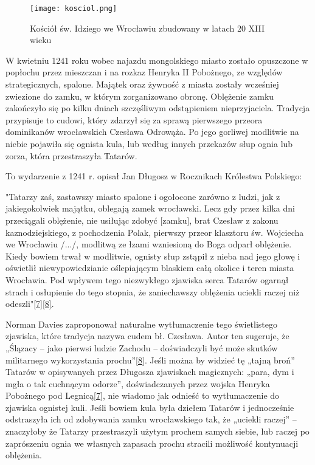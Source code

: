 \documentclass{article}
\begin{document}
\begin{wrapfigure}{r}{0.42\textwidth} 
\begin{center}
\vspace{-20pt}
\texttt{[image: kosciol.png]}
\end{center}
\vspace{-20pt}
\caption{Kościół św. Idziego we Wrocławiu zbudowany w latach 20 XIII wieku}
\vspace{-10pt}
\end{wrapfigure}
W kwietniu 1241 roku wobec najazdu mongolskiego miasto zostało opuszczone w popłochu przez mieszczan i na rozkaz Henryka II Pobożnego, ze względów strategicznych, spalone. Majątek oraz żywność z miasta zostały wcześniej zwiezione do zamku, w którym zorganizowano obronę. Oblężenie zamku zakończyło się po kilku dniach szczęśliwym odstąpieniem nieprzyjaciela. Tradycja przypisuje to cudowi, który zdarzył się za sprawą pierwszego przeora dominikanów wrocławskich Czesława Odrowąża. Po jego gorliwej modlitwie na niebie pojawiła się ognista kula, lub według innych przekazów słup ognia lub zorza, która przestraszyła Tatarów.

To wydarzenie z 1241 r. opisał Jan Długosz w Rocznikach Królestwa Polskiego: 

"Tatarzy zaś, zastawszy miasto spalone i ogołocone zarówno z ludzi, jak z jakiegokolwiek majątku, oblegają zamek wrocławski. Lecz gdy przez kilka dni przeciągali oblężenie, nie usiłując zdobyć [zamku], brat Czesław z zakonu kaznodziejskiego, z pochodzenia Polak, pierwszy przeor klasztoru św. Wojciecha we Wrocławiu /.../, modlitwą ze łzami wzniesioną do Boga odparł oblężenie. Kiedy bowiem trwał w modlitwie, ognisty słup zstąpił z nieba nad jego głowę i oświetlił niewypowiedzianie oślepiającym blaskiem całą okolice i teren miasta Wrocławia. Pod wpływem tego niezwykłego zjawiska serca Tatarów ogarnął strach i osłupienie do tego stopnia, że zaniechawszy oblężenia uciekli raczej niż odeszli"\hyperref[7]{[7]}\hyperref[8]{[8]}.

 Norman Davies zaproponował naturalne wytłumaczenie tego świetlistego zjawiska, które tradycja nazywa cudem bł. Czesława. Autor ten sugeruje, że „Ślązacy – jako pierwsi ludzie Zachodu – doświadczyli być może skutków militarnego wykorzystania prochu”\hyperref[8]{[8]}. Jeśli można by widzieć tę „tajną broń” Tatarów w opisywanych przez Długosza zjawiskach magicznych: „para, dym i mgła o tak cuchnącym odorze”, doświadczanych przez wojska Henryka Pobożnego pod Legnicą\hyperref[7]{[7]}, nie wiadomo jak odnieść to wytłumaczenie do zjawiska ognistej kuli. Jeśli bowiem kula była dziełem Tatarów i jednocześnie odstraszyła ich od zdobywania zamku wrocławskiego tak, że „uciekli raczej” – znaczyłoby że Tatarzy przestraszyli użytym prochem samych siebie, lub raczej po zaprószeniu ognia we własnych zapasach prochu stracili możliwość kontynuacji oblężenia.
\end{document}
